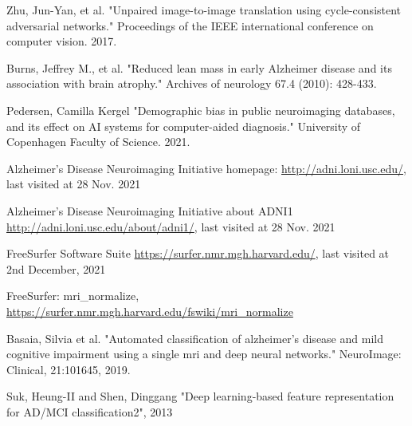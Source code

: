 \documentclass[12pt, fleqn, titlepage]{article}
\begin{document}
\newpage
\begin{thebibliography}{9} 
	
	
	
		
		
		 Zhu, Jun-Yan, et al. "Unpaired image-to-image translation using cycle-consistent adversarial networks." Proceedings of the IEEE international conference on computer vision. 2017.
		
		 Burns, Jeffrey M., et al. "Reduced lean mass in early Alzheimer disease and its association with brain atrophy." Archives of neurology 67.4 (2010): 428-433.
		
		 Pedersen, Camilla Kergel "Demographic bias in public neuroimaging databases, and its effect on AI systems for computer-aided diagnosis." University of Copenhagen Faculty of Science. 2021.
		
		  Alzheimer’s
		Disease Neuroimaging Initiative homepage: \url{http://adni.loni.usc.edu/}, last visited at 
		28 Nov. 2021
		
		 Alzheimer’s
		Disease Neuroimaging Initiative about ADNI1 \url{http://adni.loni.usc.edu/about/adni1/}, last visited at 28 Nov. 2021
		
		 FreeSurfer Software Suite \url{https://surfer.nmr.mgh.harvard.edu/}, last visited at 2nd December, 2021
		
		 FreeSurfer: mri\_normalize, \url{https://surfer.nmr.mgh.harvard.edu/fswiki/mri_normalize}
		
		 Basaia, Silvia et al. "Automated classification of alzheimer’s disease and mild cognitive impairment using a
		single mri and deep neural networks." NeuroImage: Clinical, 21:101645, 2019.
		
		 Suk, Heung-II and Shen, Dinggang
		 "Deep learning-based feature representation for AD/MCI classification2", 2013
		 

\end{thebibliography}
\end{document}
